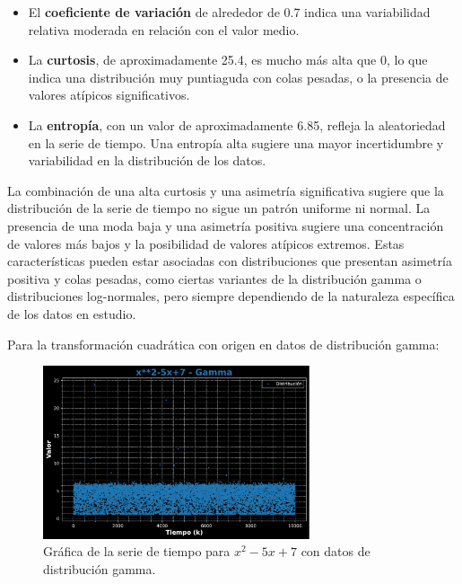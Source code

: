 \documentclass[11pt]{article} %
\begin{document}
\begin{itemize}
		\item El \textbf{coeficiente de variación} de alrededor de 0.7 indica una variabilidad relativa moderada en relación con el valor medio.
		
		\item La \textbf{curtosis}, de aproximadamente 25.4, es mucho más alta que 0, lo que indica una distribución muy puntiaguda con colas pesadas, o la presencia de valores atípicos significativos.
		
		\item La \textbf{entropía}, con un valor de aproximadamente 6.85, refleja la aleatoriedad en la serie de tiempo. Una entropía alta sugiere una mayor incertidumbre y variabilidad en la distribución de los datos.
	\end{itemize}
	
	La combinación de una alta curtosis y una asimetría significativa sugiere que la distribución de la serie de tiempo no sigue un patrón uniforme ni normal. La presencia de una moda baja y una asimetría positiva sugiere una concentración de valores más bajos y la posibilidad de valores atípicos extremos. Estas características pueden estar asociadas con distribuciones que presentan asimetría positiva y colas pesadas, como ciertas variantes de la distribución gamma o distribuciones log-normales, pero siempre dependiendo de la naturaleza específica de los datos en estudio.
	
	\newpage
	
	Para la transformación cuadrática con origen en datos de distribución gamma:
	\begin{figure}[h]
		\centering
		\includegraphics[width=0.7\textwidth]{../transformaciones/cuad_gamma1.pdf}
		\caption{Gráfica de la serie de tiempo para $x^2 - 5x + 7$ con datos de distribución gamma.}
		\label{fig:cuadGammaGraf}
	\end{figure}
	
\end{document}
